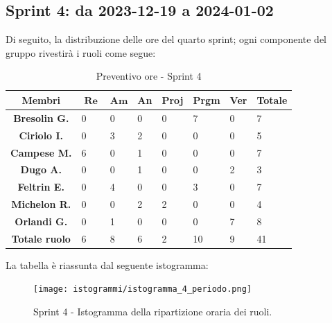 \documentclass[10pt, a4paper]{article}
\begin{document}
\subsection{Sprint 4: da 2023-12-19 a 2024-01-02}
Di seguito, la distribuzione delle ore del quarto sprint; ogni componente del gruppo rivestirà i ruoli come segue:
\begin{table}[H]
    \begin{tabularx}{\textwidth}{c|X|X|X|X|X|X|X}
        \textbf{Membri} & $\operatorname{\textbf{Re}}$ & $\mathrm{\textbf{Am}}$ & \textbf{An} & \textbf{Proj} & \textbf{Prgm} & \textbf{Ver} & \textbf{Totale} \\
        \hline
        \textbf{Bresolin G.} & 0 & 0 & 0 & 0 & \cellcolor{primarycolor}7 & 0 & 7 \\
        \hline
        \textbf{Ciriolo I.}  & 0 & 3 & \cellcolor{primarycolor}2 & 0 & 0 & 0 & 5 \\
        \hline
        \textbf{Campese M.}  & \cellcolor{primarycolor}6 & 0 & 1 & 0 & 0 & 0 & 7 \\
        \hline
        \textbf{Dugo A.}     & 0 & 0 &\cellcolor{primarycolor}1 & 0 & 0 & 2 & 3 \\
        \hline
        \textbf{Feltrin E.}  & 0 & \cellcolor{primarycolor}4 & 0 & 0 & 3 & 0 & 7 \\
        \hline
        \textbf{Michelon R.} & 0 & 0 & \cellcolor{primarycolor}2 & 2 & 0 & 0 & 4 \\
        \hline
        \textbf{Orlandi G.}  & 0 & 1 & 0 & 0 & 0 & \cellcolor{primarycolor}7 & 8 \\
        \hline
        \textbf{Totale ruolo} & 6 & 8 & 6 & 2 & 10 & 9 & 41 \\
    \end{tabularx}
    \caption{Preventivo ore - Sprint 4}
\end{table}

La tabella è riassunta dal seguente istogramma:
 \begin{figure}[H]
        \centering        
        \texttt{[image: istogrammi/istogramma\_4\_periodo.png]}
        \caption{Sprint 4 - Istogramma della ripartizione oraria dei ruoli. }
    \end{figure}
\end{document}
